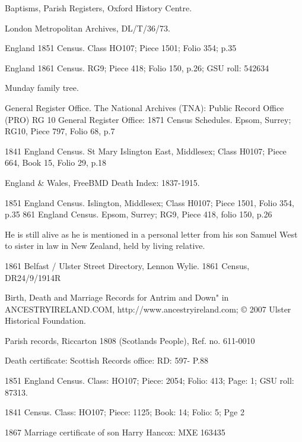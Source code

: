 \begin{thebibliography}{99}
	 Baptisms, Parish Registers, Oxford History Centre.
	 
	 London Metropolitan Archives, DL/T/36/73. 
	 
	England 1851 Census.
	Class HO107; Piece 1501; Folio 354; p.35
	
	England 1861 Census.
	RG9; Piece 418; Folio 150, p.26; GSU roll: 542634
	
	Munday family tree.
	
	General Register Office. The National Archives (TNA): Public Record Office (PRO) RG 10 General Register Office: 1871 Census Schedules.
	Epsom, Surrey; RG10, Piece 797, Folio 68, p.7
	
	1841 England Census.
	St Mary Islington East, Middlesex; Class H0107; Piece 664, Book 15, Folio 29, p.18
	
	England \& Wales, FreeBMD Death Index: 1837-1915.
	
	1851 England Census.
	Islington, Middlesex; Class H0107; Piece 1501, Folio 354, p.35
	861 England Census.
	Epsom, Surrey; RG9, Piece 418, folio 150, p.26
	
	He is still alive as he is mentioned in a personal letter from his son Samuel West to sister in law
	in New Zealand, held by living relative.
	
	 1861 Belfast / Ulster Street Directory, Lennon Wylie. 
	 1861 Census, DR24/9/1914R 
	 
	Birth, Death and Marriage Records for Antrim and Down" in ANCESTRYIRELAND.COM, 
	http://www.ancestryireland.com; © 2007 Ulster Historical Foundation. 
	
	Parish records, Riccarton 1808 (Scotlands People), Ref. no. 611-0010
	
	Death certificate: Scottish Records office: RD: 597- P.88 
	
	1851 England Census.
	Class: HO107; Piece: 2054; Folio: 413; Page: 1; GSU roll: 87313.
	
	1841 Census.
	Class: HO107; Piece: 1125; Book: 14; Folio: 5; Pge 2

	1867 Marriage certificate of son Harry Hancox: MXE 163435 


\end{thebibliography}
